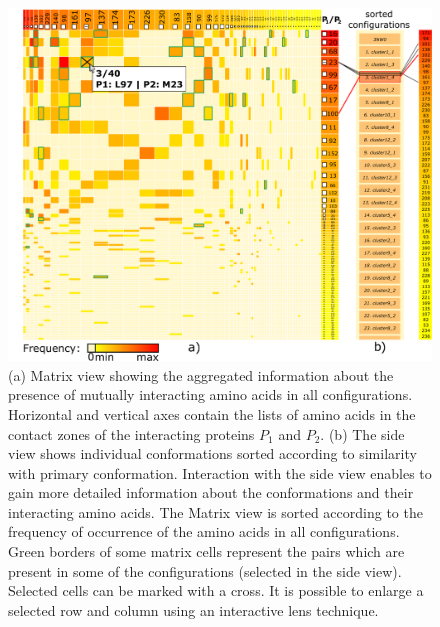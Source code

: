 \documentclass{bmcart}
\def\MatView {Matrix view\xspace}
\begin{document}
\begin{backmatter}
\begin{figure}[h!]
  \centering
  \includegraphics[width=\columnwidth]{images/figure4.pdf}
  \caption{
  (a) \MatView showing the aggregated information about the presence of mutually interacting amino acids in all configurations. Horizontal and vertical axes contain the lists of amino acids in the contact zones of the interacting proteins $P_1$ and $P_2$. (b) The side view shows individual conformations sorted according to similarity with primary conformation. Interaction with the side view enables to gain more detailed information about the conformations and their interacting amino acids. The \MatView is sorted according to the frequency of occurrence of the amino acids in all configurations. Green borders of some matrix cells represent the pairs which are present in some of the configurations (selected in the side view). Selected cells can be marked with a cross. It is possible to enlarge a selected row and column using an interactive lens technique.}
  \label{fig:matrixlens}
\end{figure}





\end{backmatter}
\end{document}
